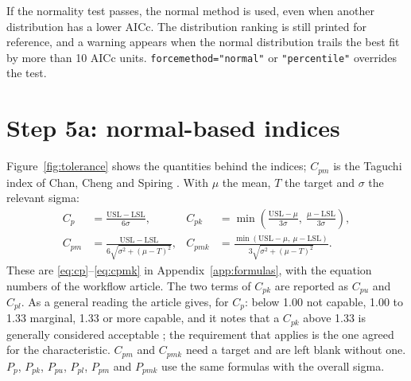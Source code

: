 \documentclass[a4paper,11pt,oneside,openany,parskip=half-,headings=standardclasses,toc=flat,numbers=noenddot]{scrbook}
\newcommand{\code}[1]{\texttt{\begingroup\def\_{\textunderscore\allowbreak}#1\endgroup}}
\newcommand{\figref}[1]{Figure~\ref{#1}}
\begin{document}
\begin{keypoint}
If the normality test passes, the normal method is used, even when another distribution has a lower
AICc. The distribution ranking is still printed for reference, and a warning appears when the normal
distribution trails the best fit by more than 10 AICc units. \code{force\_method="normal"} or
\code{"percentile"} overrides the test.
\end{keypoint}

\section{Step 5a: normal-based indices}

\figref{fig:tolerance} shows the quantities behind the indices; $C_{pm}$ is the Taguchi index of Chan, Cheng
and Spiring \cite{chan}. With $\mu$ the mean, $T$ the target
and $\sigma$ the relevant sigma:
\begin{align*}
C_p &= \frac{\mathrm{USL}-\mathrm{LSL}}{6\sigma}, &
C_{pk} &= \min\left(\frac{\mathrm{USL}-\mu}{3\sigma},\ \frac{\mu-\mathrm{LSL}}{3\sigma}\right),\\[3pt]
C_{pm} &= \frac{\mathrm{USL}-\mathrm{LSL}}{6\sqrt{\sigma^{2}+(\mu-T)^{2}}}, &
C_{pmk} &= \frac{\min\left(\mathrm{USL}-\mu,\ \mu-\mathrm{LSL}\right)}{3\sqrt{\sigma^{2}+(\mu-T)^{2}}}.
\end{align*}
These are \eqref{eq:cp}--\eqref{eq:cpmk} in Appendix~\ref{app:formulas}, with the equation numbers of the
workflow article. The two terms of $C_{pk}$ are reported as $C_{pu}$ and $C_{pl}$. As a general reading the article
gives, for $C_p$: below 1.00 not capable, 1.00 to 1.33 marginal, 1.33 or more capable, and it notes that a
$C_{pk}$ above 1.33 is generally considered acceptable \cite[Secs.~3.1, 3.2]{jy-workflow}; the requirement that
applies is the one agreed for the characteristic. $C_{pm}$ and $C_{pmk}$ need a target and are left blank without
one. $P_p$, $P_{pk}$, $P_{pu}$, $P_{pl}$, $P_{pm}$ and
$P_{pmk}$ use the same formulas with the overall sigma.
\end{document}
